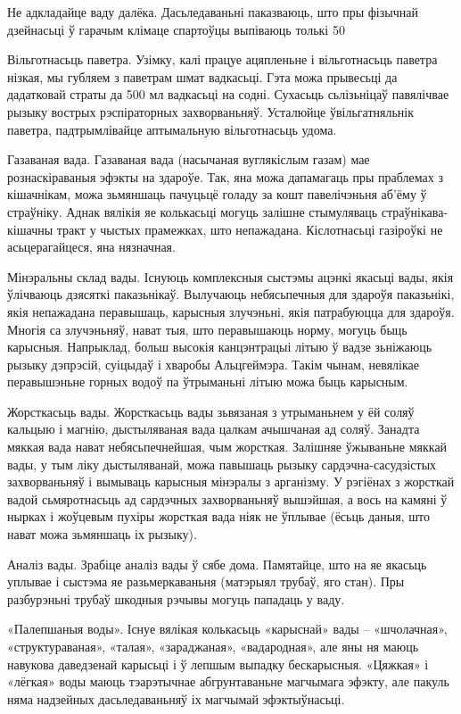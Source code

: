 Не адкладайце ваду далёка.
Дасьледаваньні паказваюць, што пры фізычнай дзейнасьці ў гарачым клімаце спартоўцы выпіваюць толькі 50%

Вільготнасьць паветра.
Узімку, калі працуе ацяпленьне і вільготнасьць паветра нізкая, мы губляем з паветрам шмат вадкасьці. Гэта можа прывесьці да дадатковай страты да 500 мл вадкасьці на содні. Сухасьць сьлізьніцаў павялічвае рызыку вострых рэспіраторных захворваньняў. Усталюйце ўвільгатняльнік паветра, падтрымлівайце аптымальную вільготнасьць удома.

Газаваная вада.
Газаваная вада (насычаная вуглякіслым газам) мае рознаскіраваныя эфэкты на здароўе. Так, яна можа дапамагаць пры праблемах з кішачнікам, можа зьмяншаць пачуцьцё голаду за кошт павелічэньня аб'ёму ў страўніку. Аднак вялікія яе колькасьці могуць залішне стымуляваць страўнікава-кішачны тракт у чыстых прамежках, што непажадана. Кіслотнасьці газіроўкі не асьцерагайцеся, яна нязначная.

Мінэральны склад вады.
Існуюць комплексныя сыстэмы ацэнкі якасьці вады, якія ўлічваюць дзясяткі паказьнікаў. Вылучаюць небясьпечныя для здароўя паказьнікі, якія непажадана перавышаць, карысныя злучэньні, якія патрабуюцца для здароўя. Многія са злучэньняў, нават тыя, што перавышаюць норму, могуць быць карысныя. Напрыклад, больш высокія канцэнтрацыі літыю ў вадзе зьніжаюць рызыку дэпрэсій, суіцыдаў і хваробы Альцгеймэра. Такім чынам, невялікае перавышэньне горных водоў па ўтрыманьні літыю можа быць карысным.

Жорсткасьць вады.
Жорсткасьць вады зьвязаная з утрыманьнем у ёй соляў кальцыю і магнію, дыстыляваная вада цалкам ачышчаная ад соляў. Занадта мяккая вада нават небясьпечнейшая, чым жорсткая. Залішняе ўжываньне мяккай вады, у тым ліку дыстыляванай, можа павышаць рызыку сардэчна-сасудзістых захворваньняў і вымываць карысныя мінэралы з арганізму. У рэгіёнах з жорсткай вадой сьмяротнасьць ад сардэчных захворваньняў вышэйшая, а вось на камяні ў нырках і жоўцевым пухіры жорсткая вада ніяк не ўплывае (ёсьць даныя, што нават можа зьмяншаць іх рызыку).

Аналіз вады.
Зрабіце аналіз вады ў сябе дома. Памятайце, што на яе якасьць уплывае і сыстэма яе разьмеркаваньня (матэрыял трубаў, яго стан). Пры разбурэньні трубаў шкодныя рэчывы могуць пападаць у ваду.

«Палепшаныя воды».
Існуе вялікая колькасьць «карыснай» вады – «шчолачная», «структураваная», «талая», «зараджаная», «вадародная», але яны ня маюць навукова даведзенай карысьці і ў лепшым выпадку бескарысныя. «Цяжкая» і «лёгкая» воды маюць тэарэтычнае абгрунтаваньне магчымага эфэкту, але пакуль няма надзейных дасьледаваньняў іх магчымай эфэктыўнасьці.

